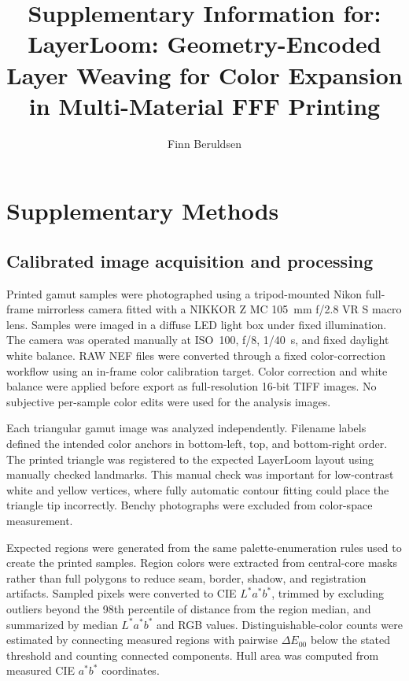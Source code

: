 \documentclass[preprint,12pt,authoryear]{elsarticle}
\begin{document}
\begin{frontmatter}

\title{Supplementary Information for: LayerLoom: Geometry-Encoded Layer Weaving for Color Expansion in Multi-Material FFF Printing}

\author[uh]{Finn Beruldsen}


\end{frontmatter}

\section*{Supplementary Methods}

\subsection*{Calibrated image acquisition and processing}

Printed gamut samples were photographed using a tripod-mounted Nikon full-frame mirrorless camera fitted with a NIKKOR Z MC 105~mm f/2.8 VR S macro lens. Samples were imaged in a diffuse LED light box under fixed illumination. The camera was operated manually at ISO~100, f/8, 1/40~s, and fixed daylight white balance. RAW NEF files were converted through a fixed color-correction workflow using an in-frame color calibration target. Color correction and white balance were applied before export as full-resolution 16-bit TIFF images. No subjective per-sample color edits were used for the analysis images.

Each triangular gamut image was analyzed independently. Filename labels defined the intended color anchors in bottom-left, top, and bottom-right order. The printed triangle was registered to the expected LayerLoom layout using manually checked landmarks. This manual check was important for low-contrast white and yellow vertices, where fully automatic contour fitting could place the triangle tip incorrectly. Benchy photographs were excluded from color-space measurement.

Expected regions were generated from the same palette-enumeration rules used to create the printed samples. Region colors were extracted from central-core masks rather than full polygons to reduce seam, border, shadow, and registration artifacts. Sampled pixels were converted to CIE \(L^*a^*b^*\), trimmed by excluding outliers beyond the 98th percentile of distance from the region median, and summarized by median \(L^*a^*b^*\) and RGB values. Distinguishable-color counts were estimated by connecting measured regions with pairwise \(\Delta E_{00}\) below the stated threshold and counting connected components. Hull area was computed from measured CIE \(a^*b^*\) coordinates.
\end{document}
